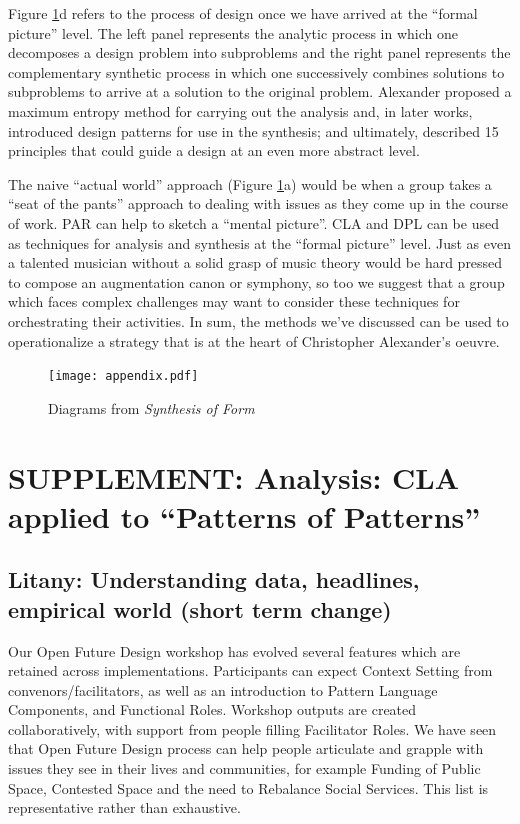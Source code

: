 \documentclass[acmlarge,timestamp]{acmart}
\begin{document}

Figure \ref{synthesis-diagrams}d refers to the process of design once
we have arrived at the ``formal picture'' level.  The left panel
represents the analytic process in which one decomposes a design
problem into subproblems and the right panel represents the
complementary synthetic process in which one successively combines
solutions to subproblems to arrive at a solution to the original
problem.  Alexander proposed a maximum entropy method for carrying out
the analysis and, in later works, introduced design patterns for use
in the synthesis; and ultimately, described 15 principles that could
guide a design at an even more abstract level.

The naive ``actual world'' approach (Figure \ref{synthesis-diagrams}a)
would be when a group takes a ``seat of the pants'' approach to
dealing with issues as they come up in the course of work.  PAR can
help to sketch a ``mental picture''.  CLA and DPL can be used as
techniques for analysis and synthesis at the ``formal picture'' level.
 Just as even a talented
musician without a solid grasp of music theory would be hard pressed
to compose an augmentation canon or symphony, so too we suggest that a
group which faces complex challenges may want to consider these
techniques for orchestrating their activities.  In sum, the methods
we’ve discussed can be used to operationalize a strategy that is at
the heart of Christopher Alexander’s oeuvre.

\begin{figure}[h]
\texttt{[image: appendix.pdf]}
\caption{Diagrams from \emph{Synthesis of Form}\label{synthesis-diagrams}}
\end{figure}
\FloatBarrier

\section{SUPPLEMENT: Analysis: CLA applied to “Patterns of Patterns”} \label{cla-appendix}
\subsection{Litany: Understanding data, headlines, empirical world (short term change)}
Our Open Future Design workshop has evolved several features which are
retained across implementations.  Participants can expect {\sc
  Context Setting} from convenors/facilitators, as well as an
introduction to {\sc Pattern Language Components}, and {\sc Functional
  Roles}.  Workshop outputs are created collaboratively, with support
from people filling {\sc Facilitator Roles}.  We have seen that Open
Future Design process can help people articulate and grapple with
issues they see in their lives and communities, for example {\sc
  Funding of Public Space}, {\sc Contested Space} and the need to {\sc
  Rebalance Social Services}.  This list is representative rather than
exhaustive.  
\end{document}
